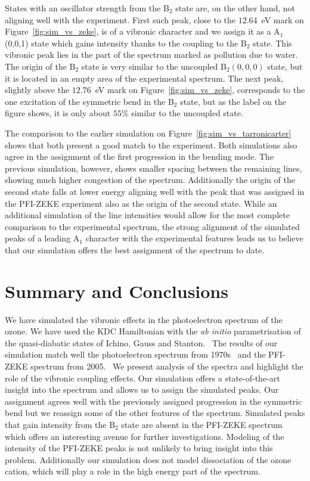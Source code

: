 \documentclass[
12pt,
a4paper,
prb,
superscriptaddress,
tightenlines,  %
]{revtex4}
\begin{document}
States with an oscillator strength from the B$_2$ state are, on the other
hand, not aligning well with the experiment. First such peak, close to the
$12.64$~eV mark on Figure~\ref{fig:sim_vs_zeke}, is of a vibronic
character and we assign it as a A$_1$(0,0,1) state which gains intensity
thanks to the coupling to the B$_2$ state. This vibronic peak lies in the part
of the spectrum marked as pollution due to water. The origin of the B$_2$
state is very similar to the uncoupled B$_2(0,0,0)$ state, but it is located
in an empty area of the experimental spectrum. The next peak, slightly above
the $12.76$~eV mark on Figure~\ref{fig:sim_vs_zeke}, corresponds to the one
excitation of the symmetric bend in the B$_2$ state, but as the label on the
figure shows, it is only about $55$\% similar to the uncoupled state.

The comparison to the earlier simulation on
Figure~\ref{fig:sim_vs_tarronicarter} shows that both present a good match to
the experiment. Both simulations also agree in the assignment of the first
progression in the bending mode. The previous simulation, however, shows
smaller spacing between the remaining lines, showing much higher congestion of
the spectrum. Additionally the origin of the second state falls at lower
energy aligning well with the peak that was assigned in the PFI-ZEKE
experiment also as the origin of the second state. While an additional
simulation of the line intensities would allow for the most complete
comparison to the experimental spectrum, the strong alignment of the simulated
peaks of a leading A$_1$ character with the experimental features leads us to
believe that our simulation offers the best assignment of the spectrum to
date.

\section{Summary and Conclusions} 

We have simulated the vibronic effects in the photoelectron spectrum of the
ozone.  We have used the KDC Hamiltonian\cite{Cederbaum:LVC:84, KDC:81,
Koppel:CIbookCh7:04} with the \emph{ab initio} parametrisation of the
quasi-diabatic states of Ichino, Gauss and Stanton.~\cite{Stanton:EOMIPdeg:09}
The results of our simulation match well the photoelectron spectrum from
1970s~\cite{dyke:O3:74} and the PFI-ZEKE spectrum from
2005.~\cite{Willitsch:O3ZEKE:2005} We present analysis of the spectra and
highlight the role of the vibronic coupling effects. Our simulation offers a
state-of-the-art insight into the spectrum and allows us to assign the
simulated peaks. Our assignment agrees well with the previously assigned
progression in the symmetric bend but we reassign some of the other features
of the spectrum. Simulated peaks that gain intensity from the B$_2$ state are
absent in the PFI-ZEKE spectrum which offers an interesting avenue for further
investigations. Modeling of the intensity of the PFI-ZEKE peaks is not
unlikely to bring insight into this problem.  Additionally our simulation does
not model dissociation of the ozone cation, which will play a role in the high
energy part of the spectrum.
\end{document}
